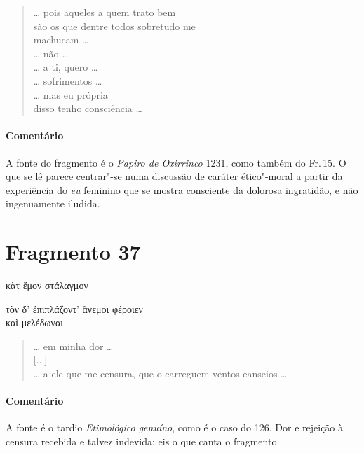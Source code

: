 \begin{verse}
\ldots{} pois aqueles a quem trato bem\\
são os que dentre todos sobretudo me\\
machucam \ldots{}\\
\ldots{} não \ldots{}\\
\ldots{} a ti, quero \ldots{}\\
\ldots{} sofrimentos \ldots{}\\
\ldots{} mas eu própria\\
disso tenho consciência \ldots{}
\end{verse}

\medskip

\paragraph{Comentário} A fonte do fragmento é o \emph{Papiro de Oxirrinco} 1231, como também do Fr.\,15. O que se lê parece centrar"-se numa discussão de caráter ético"-moral
a partir da experiência do \emph{eu} feminino que se mostra consciente da dolorosa
ingratidão, e não ingenuamente iludida.

\section{Fragmento 37}

\begin{gkverse}
κὰτ ἔμον στάλαγμον\\

\medskip 

\hspace*{16mm}{\minion [...]}

τὸν δ’ ἐπιπλάζοντ’ ἄνεμοι φέροιεν\\
      καὶ μελέδωναι
\end{gkverse}

\begin{verse}
\ldots{} em minha dor \ldots{}\\[2mm]

\hspace*{16mm}[...]\\[2mm]

\ldots{} a ele que me censura, que o carreguem ventos e\qb{}anseios \ldots{}
\end{verse}

\medskip

{\paragraph{Comentário} A fonte é o tardio \emph{Etimológico genuíno}, como é o caso do 126. Dor e
rejeição à censura recebida e talvez indevida: eis o que canta o fragmento.}


